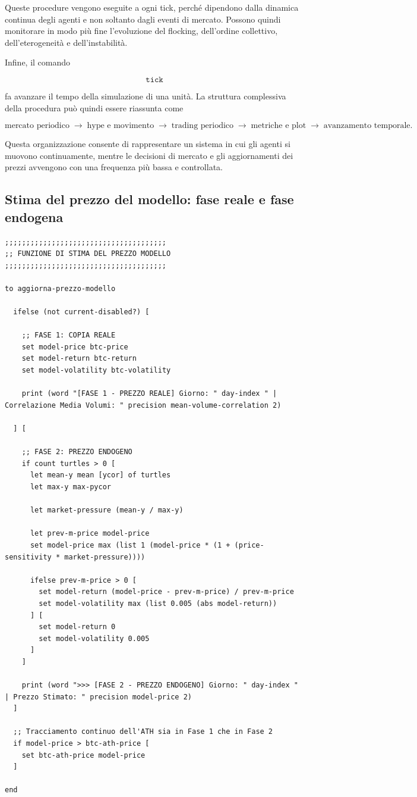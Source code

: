 Queste procedure vengono eseguite a ogni tick, perché dipendono dalla dinamica
continua degli agenti e non soltanto dagli eventi di mercato. Possono quindi
monitorare in modo più fine l'evoluzione del flocking, dell'ordine collettivo,
dell'eterogeneità e dell'instabilità.

Infine, il comando

\[
\texttt{tick}
\]

fa avanzare il tempo della simulazione di una unità. La struttura complessiva
della procedura può quindi essere riassunta come

\[
\text{mercato periodico}
\;\longrightarrow\;
\text{hype e movimento}
\;\longrightarrow\;
\text{trading periodico}
\;\longrightarrow\;
\text{metriche e plot}
\;\longrightarrow\;
\text{avanzamento temporale}.
\]

Questa organizzazione consente di rappresentare un sistema in cui gli agenti si
muovono continuamente, mentre le decisioni di mercato e gli aggiornamenti dei
prezzi avvengono con una frequenza più bassa e controllata.

\subsection{Stima del prezzo del modello: fase reale e fase endogena}

\begin{lstlisting}[caption={Procedura di aggiornamento del prezzo del modello}]
;;;;;;;;;;;;;;;;;;;;;;;;;;;;;;;;;;;;;;
;; FUNZIONE DI STIMA DEL PREZZO MODELLO
;;;;;;;;;;;;;;;;;;;;;;;;;;;;;;;;;;;;;;

to aggiorna-prezzo-modello

  ifelse (not current-disabled?) [

    ;; FASE 1: COPIA REALE
    set model-price btc-price
    set model-return btc-return
    set model-volatility btc-volatility

    print (word "[FASE 1 - PREZZO REALE] Giorno: " day-index " | Correlazione Media Volumi: " precision mean-volume-correlation 2)

  ] [

    ;; FASE 2: PREZZO ENDOGENO
    if count turtles > 0 [
      let mean-y mean [ycor] of turtles
      let max-y max-pycor

      let market-pressure (mean-y / max-y)

      let prev-m-price model-price
      set model-price max (list 1 (model-price * (1 + (price-sensitivity * market-pressure))))

      ifelse prev-m-price > 0 [
        set model-return (model-price - prev-m-price) / prev-m-price
        set model-volatility max (list 0.005 (abs model-return))
      ] [
        set model-return 0
        set model-volatility 0.005
      ]
    ]

    print (word ">>> [FASE 2 - PREZZO ENDOGENO] Giorno: " day-index " | Prezzo Stimato: " precision model-price 2)
  ]

  ;; Tracciamento continuo dell'ATH sia in Fase 1 che in Fase 2
  if model-price > btc-ath-price [
    set btc-ath-price model-price
  ]

end
\end{lstlisting}

